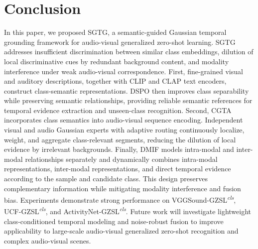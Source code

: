 
\section{Conclusion}\label{sec:conclusion}

In this paper, we proposed SGTG, a semantic-guided Gaussian temporal grounding framework for audio-visual generalized zero-shot learning. SGTG addresses insufficient discrimination between similar class embeddings, dilution of local discriminative cues by redundant background content, and modality interference under weak audio-visual correspondence. First, fine-grained visual and auditory descriptions, together with CLIP and CLAP text encoders, construct class-semantic representations. DSPO then improves class separability while preserving semantic relationships, providing reliable semantic references for temporal evidence extraction and unseen-class recognition. Second, CGTA incorporates class semantics into audio-visual sequence encoding. Independent visual and audio Gaussian experts with adaptive routing continuously localize, weight, and aggregate class-relevant segments, reducing the dilution of local evidence by irrelevant backgrounds. Finally, DMIF models intra-modal and inter-modal relationships separately and dynamically combines intra-modal representations, inter-modal representations, and direct temporal evidence according to the sample and candidate class. This design preserves complementary information while mitigating modality interference and fusion bias. Experiments demonstrate strong performance on VGGSound-GZSL\textsuperscript{\textit{cls}}, UCF-GZSL\textsuperscript{\textit{cls}}, and ActivityNet-GZSL\textsuperscript{\textit{cls}}. Future work will investigate lightweight class-conditioned temporal modeling and noise-robust fusion to improve applicability to large-scale audio-visual generalized zero-shot recognition and complex audio-visual scenes.
